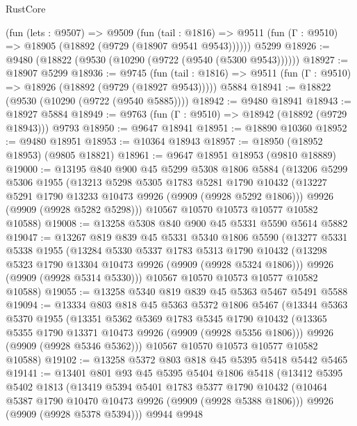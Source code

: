\begin{lexlean}{RustCore}
\begin{coremodule}
    (fun (lets : @9507) =>
    @9509
      (fun (tail : @1816) =>
      @9511 (fun (Γ : @9510) => @18905 (@18892 (@9729 (@18907 @9541 @9543))))))
    @5299
@18926 := @9480 (@18822 (@9530 (@10290 (@9722 (@9540 (@5300 @9543))))))
@18927 := @18907 @5299
@18936 := @9745
    (fun (tail : @1816) => @9511 (fun (Γ : @9510) => @18926 (@18892 (@9729 (@18927 @9543)))))
    @5884
@18941 := @18822 (@9530 (@10290 (@9722 (@9540 @5885))))
@18942 := @9480 @18941
@18943 := @18927 @5884
@18949 := @9763 (fun (Γ : @9510) => @18942 (@18892 (@9729 @18943))) @9793
@18950 := @9647 @18941
@18951 := @18890 @10360
@18952 := @9480 @18951
@18953 := @10364 @18943
@18957 := @18950 (@18952 @18953) (@9805 @18821)
@18961 := @9647 @18951 @18953 (@9810 @18889)
@19000 := @13195
    @840
    @900
    @45
    @5299
    @5308
    @1806
    @5884
    (@13206
      @5299
      @5306
      @1955
      (@13213
        @5298
        @5305
        @1783
        @5281
        @1790
        @10432
        (@13227 @5291 @1790 @13233 @10473 @9926 (@9909 (@9928 @5292 @1806)))
        @9926
        (@9909 (@9928 @5282 @5298)))
      @10567
      @10570
      @10573
      @10577
      @10582
      @10588)
@19008 := @13258 @5308 @840 @900 @45 @5331 @5590 @5614 @5882
@19047 := @13267
    @819
    @839
    @45
    @5331
    @5340
    @1806
    @5590
    (@13277
      @5331
      @5338
      @1955
      (@13284
        @5330
        @5337
        @1783
        @5313
        @1790
        @10432
        (@13298 @5323 @1790 @13304 @10473 @9926 (@9909 (@9928 @5324 @1806)))
        @9926
        (@9909 (@9928 @5314 @5330)))
      @10567
      @10570
      @10573
      @10577
      @10582
      @10588)
@19055 := @13258 @5340 @819 @839 @45 @5363 @5467 @5491 @5588
@19094 := @13334
    @803
    @818
    @45
    @5363
    @5372
    @1806
    @5467
    (@13344
      @5363
      @5370
      @1955
      (@13351
        @5362
        @5369
        @1783
        @5345
        @1790
        @10432
        (@13365 @5355 @1790 @13371 @10473 @9926 (@9909 (@9928 @5356 @1806)))
        @9926
        (@9909 (@9928 @5346 @5362)))
      @10567
      @10570
      @10573
      @10577
      @10582
      @10588)
@19102 := @13258 @5372 @803 @818 @45 @5395 @5418 @5442 @5465
@19141 := @13401
    @801
    @93
    @45
    @5395
    @5404
    @1806
    @5418
    (@13412
      @5395
      @5402
      @1813
      (@13419
        @5394
        @5401
        @1783
        @5377
        @1790
        @10432
        (@10464 @5387 @1790 @10470 @10473 @9926 (@9909 (@9928 @5388 @1806)))
        @9926
        (@9909 (@9928 @5378 @5394)))
      @9944
      @9948

\end{coremodule}
\end{lexlean}
